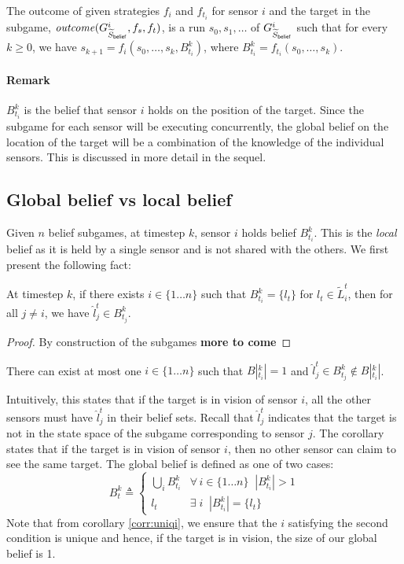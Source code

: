 The outcome of given strategies $f_{i}$ and $f_{t_i}$ for sensor $i$ and the target in the subgame, $\mathit{outcome}(G^{i}_{\widetilde{S}_{\mathsf{belief}}},f_s,f_t)$, is a run $s_0,s_1,\ldots$ of $G^{i}_{\widetilde{S}_{\mathsf{belief}}}$ such that for every $k \geq 0$, we have $s_{k+1} = f_i(s_0,\ldots,s_k,B^k_{t_i})$, where $B^k_{t_i} = f_{t_i}(s_0,\ldots,s_k)$.

\paragraph*{Remark}$B^k_{t_i}$ is the belief that sensor $i$ holds on the position of the target. Since the subgame for each sensor will be executing concurrently, the global belief on the location of the target will be a combination of the knowledge of the individual sensors. This is discussed in more detail in the sequel.

\subsection{Global belief vs local belief}
Given $n$ belief subgames, at timestep $k$, sensor $i$ holds belief $B^k_{t_i}$. This is the \emph{local} belief as it is held by a single sensor and is not shared with the others. We first present the following fact: 
\begin{theorem} 
At timestep $k$, if there exists $i\in \{1\dots n\}$ such that $B^k_{t_i} = \{l_t\}$ for $l_t \in \widetilde{L}_i^t$, then for all $j \neq i$, we have $\hat{l}^t_j \in B^k_{t_j}$.
\end{theorem}
\begin{proof}
By construction of the subgames \textbf{more to come}
\end{proof}
\begin{corollary}\label{corr:uniqi}
There can exist at most one $i\in \{1\dots n\}$ such that $B|^k_{t_i}| = 1$ and $\hat{l}^t_j \in B^k_{t_j} \notin B|^k_{t_i}|$.
\end{corollary}
Intuitively, this states that if the target is in vision of sensor $i$, all the other sensors must have $\hat{l}^t_j$ in their belief sets. Recall that $\hat{l}^t_j$ indicates that the target is not in the state space of the subgame corresponding to sensor $j$. The corollary states that if the target is in vision of sensor $i$, then no other sensor can claim to see the same target. 
The global belief is defined as one of two cases:
\[B^k_t \triangleq \begin{cases}
\bigcup_{i}B^k_{t_i} & \forall \, i \in \{1\dots n\} \;\; |B^k_{t_i}| > 1\\
l_t & \exists \; i \;\; |B^k_{t_i}| = \{l_t\} 
\end{cases}
\]
Note that from corollary \ref{corr:uniqi}, we ensure that the $i$ satisfying the second condition is unique and hence, if the target is in vision, the size of our global belief is 1. 
